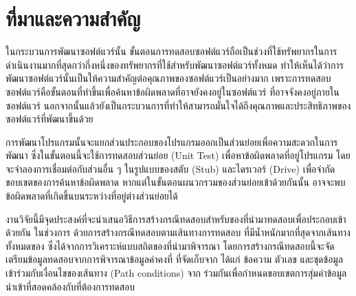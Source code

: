\section{ที่มาและความสำคัญ} 

ในกระบวนการพัฒนาซอฟต์แวร์นั้น ขั้นตอนการทดสอบซอฟต์แวร์ถือเป็นช่วงที่ใช้ทรัพยากรในการดำเนินงานมากที่สุดกว่ากึ่งหนึ่งของทรัพยากรที่ใช้สำหรับพัฒนาซอฟต์แวร์ทั้งหมด 
ทำให้เห็นได้ว่าการพัฒนาซอฟต์แวร์นั้นเป็นให้ความสำคัญต่อคุณภาพของซอฟต์แวร์เป็นอย่างมาก 
เพราะการทดสอบซอฟต์แวร์คือขั้นตอนที่ทำขึ้นเพื่อค้นหาข้อผิดพลาดที่อาจยังคงอยู่ในซอฟต์แวร์ ที่อาจจังคงอยู่ภายในซอฟต์แวร์ \cite{Myers:2011:AST:983238} 
นอกจากนั้นแล้วยังเป็นกระบวนการที่ทำให้สามารถมั่นใจได้ถึงคุณภาพและประสิทธิภาพของซอฟต์แวร์ที่พัฒนาขึ้นด้วย




การพัฒนาโปรแกรมนั้นจะแยกส่วนประกอบของโปรแกรมออกเป็นส่วนย่อยเพื่อความสะดวกในการพัฒนา ซึ่งในขั้นตอนนี้จะใช้การทดสอบส่วนย่อย (Unit Test) 
เพื่อหาข้อผิดพลาดที่อยู่โปรแกรม โดยจะจำลองการเชื่อมต่อกับส่วนอื่น ๆ ในรูปแบบของสตับ (Stub) และไดรเวอร์ (Drive) เพื่อจำกัดขอบเขตของการค้นหาข้อผิดพลาด
หากแต่ในขั้นตอนผนวกรวม{\sourcecode}ของส่วนย่อยเข้าด้วยกันนั้น อาจจะพบข้อผิดพลาดที่เกิดขึ้นบน{\Path}ระหว่าง{\class}ที่อยู่ต่างส่วนย่อยได้

งานวิจัยนี้มีจุดประสงค์ที่จะนำเสนอวิธีการสร้างกรณีทดสอบสำหรับ{\sourcecode}ของ{\softwareComponent}ที่นำมาทดสอบเพื่อประกอบเข้าด้วยกัน
ในช่วงการ\FirstTimeDefine{\IntegrationTesting}{\IntegrationTestingEN} ด้วยการสร้างกรณีทดสอบตามเส้นทางการทดสอบ
ที่มีน้ำหนักมากที่สุดจากเส้นทางทั้งหมดของ{\scg} ซึ่งได้จากการวิเคราะห์แบบสถิตของ{\sourcecode}ที่นำมาพิจารณา 
โดยการสร้างกรณีทดสอบนี้จะจัดเตรียมข้อมูลทดสอบจากการพิจารณาข้อมูลค่าคงที่ ที่จัดเก็บจาก{\sourcecode} ได้แก่ ข้อความ ตัวเลข และชุดข้อมูล 
เข้าร่วมกับเงื่อนไขของเส้นทาง (Path conditions) จาก{\cfg} ร่วมกันเพื่อกำหนดขอบเขตการสุ่มค่าข้อมูลนำเข้าที่สอดคล้องกับ{\MethodSignature}ที่ต้องการทดสอบ

